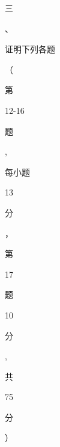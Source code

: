 \documentclass[10pt]{article}
\begin{document}
\begin{CJK}{UTF8}{mj}三\end{CJK}、\begin{CJK}{UTF8}{mj}证明下列各题\end{CJK}（\begin{CJK}{UTF8}{mj}第\end{CJK} 12-16 \begin{CJK}{UTF8}{mj}题\end{CJK}, \begin{CJK}{UTF8}{mj}每小题\end{CJK} 13 \begin{CJK}{UTF8}{mj}分\end{CJK}，\begin{CJK}{UTF8}{mj}第\end{CJK} 17 \begin{CJK}{UTF8}{mj}题\end{CJK} 10 \begin{CJK}{UTF8}{mj}分\end{CJK}, \begin{CJK}{UTF8}{mj}共\end{CJK} 75 \begin{CJK}{UTF8}{mj}分\end{CJK}）
\end{document}
